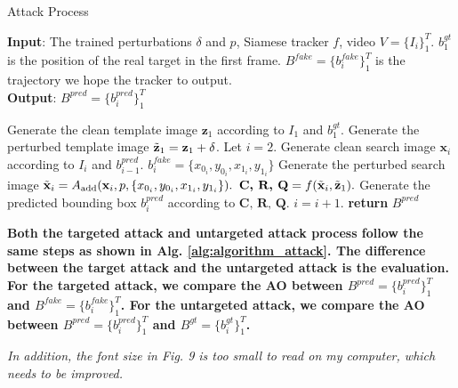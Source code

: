 \documentclass[12pt]{article}
\begin{document}
\begin{algorithm}[tb]
    \caption{Attack Process}
    \label{alg:algorithm_attack}
    \textbf{Input}: The trained perturbations $\delta$ and $p$, Siamese tracker $f$, video $V=\{I_i\}_1^T$. $b^{gt}_1$ is the position of the real target in the first frame. $B^{fake}=\{b^{fake}_i\}_1^{T}$ is the trajectory we hope the tracker to output.\\
    \textbf{Output}: $B^{pred}=\{b^{pred}_i\}_1^{T}$
    \begin{algorithmic}[1] %
      \STATE Generate the clean template image $\textbf{z}_1$ according to $I_1$ and $b^{gt}_1$.
      \STATE Generate the perturbed template image $\tilde{\textbf z}_1=\textbf z_1+\delta$.
      \STATE Let $i = 2$.
    \STATE Generate clean search image $\textbf{x}_i$ according to $I_i$ and $b^{pred}_{i-1}$.
    \STATE $b^{fake}_i=\{x_{0_i}, y_{0_i}, x_{1_i}, y_{1_i}\}$
    \STATE Generate the perturbed search image $\tilde{\textbf x}_i = A_{\text{add}}(\textbf x_i, p, \{x_{0_i}, y_{0_i}, x_{1_i}, y_{1_i}\}).$
    \STATE $\textbf{C, R, Q} = f(\tilde {\textbf x}_i, \tilde{\textbf z}_1).$
    \STATE Generate the predicted bounding box $b^{pred}_i$ according to $\textbf{C, R, Q}$.
    \STATE $i = i + 1.$
    \ENDWHILE
    \STATE \textbf{return} $B^{pred}$
    \end{algorithmic}
\end{algorithm}

\textbf{Both the targeted attack and untargeted attack process follow the same steps as shown in Alg. \ref{alg:algorithm_attack}. The difference between the target attack and the untargeted attack is the evaluation. For the targeted attack, we compare the AO between $B^{pred}=\{b^{pred}_i\}_1^{T}$ and $B^{fake}=\{b^{fake}_i\}_1^{T}$. For the untargeted attack, we compare the AO between $B^{pred}=\{b^{pred}_i\}_1^{T}$ and $B^{gt}=\{b^{gt}_i\}_1^{T}$.}

\textit{In addition, the font size in Fig. 9 is too small to read on my computer, which needs to be improved.}

\end{document}
